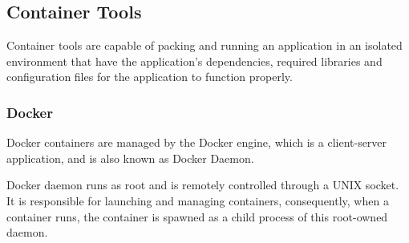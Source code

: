 \documentclass[a4paper,num-refs]{oup-contemporary}
\begin{document}

\subsection{Container Tools}

Container tools are capable of packing and running an application in an isolated environment that have
the application's dependencies,
required libraries and configuration files for the
application to function properly.

\subsubsection{Docker}

Docker containers are managed by the Docker engine, which is a client-server application, and
is also known as Docker Daemon.

Docker daemon runs as root and is remotely controlled through a
UNIX socket. It is responsible for launching and managing containers,
consequently, when a container runs, the container is spawned as a
child process of this root-owned daemon.
\end{document}

